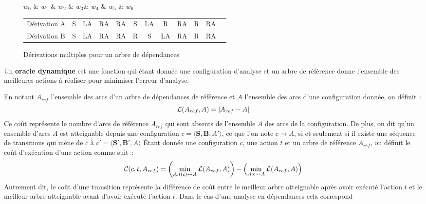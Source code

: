\documentclass[11pt,openany]{book}
\begin{document}
\begin{figure}[htbp]
\begin{center}
\begin{dependency}
\begin{deptext}[column sep=.5cm]
$w_0$ \& $w_1$ \& $w_2$ \& $w_3$\& $w_4$ \& $w_5$ \& $w_6$ \\
\end{deptext}
\end{dependency}
\begin{tabular}{l|ccccccccccc}\toprule
Dérivation A&S&LA&RA&RA&S&LA&R&RA&R&RA\\
Dérivation B&S&LA&RA&RA&R&S&LA&RA&R&RA\\\bottomrule
\end{tabular}
\end{center}
\caption{\label{fig-multi-deriv}Dérivations multiples pour un arbre de dépendances}
\end{figure}

Un {\bf oracle dynamique} est une fonction qui étant donnée une
configuration d'analyse et un arbre de référence donne l'ensemble des meilleures
actions à réaliser pour minimiser l'erreur d'analyse.

En notant $A_{ref}$ l'ensemble des arcs d'un arbre de dépendances de
référence et $A$ l'ensemble des arcs d'une configuration donnée, on
définit~:
\begin{equation}
{\cal L} (A_{ref},A) = |A_{ref} - A|
\end{equation}
Ce coût représente le nombre d'arcs de référence $A_{ref}$ qui sont
absents de l'ensemble  $A$ des arcs de la configuration. 
De plus, on dit qu'un ensemble d'arcs $A$ est atteignable depuis une
configuration $c = \langle \mathbf{S},\mathbf{B},A'\rangle$, ce que
l'on note $c\rightsquigarrow A$, si et seulement si il existe
une séquence de transitions qui mène de $c$ à $c' = \langle \mathbf{S}',\mathbf{B}',A\rangle$
\'Etant donnée une configuration $c$, une action $t$ et un arbre de
référence $A_{ref}$, on définit le coût d'exécution d'une action comme 
suit~:
\begin{equation}
\label{eq-odyn-objective}
{\cal C}(c,t,A_{ref}) = \left(\mathop{\text{min}}_{A:t(c)\rightsquigarrow A} {\cal
  L}(A_{ref},A) \right)- \left(\mathop{\text{min}}_{A:c\rightsquigarrow A} {\cal
  L}(A_{ref},A)  \right) 
\end{equation}
Autrement dit, le coût d'une transition représente la différence de
coût entre le meilleur arbre atteignable après avoir exécuté l'action $t$
et le meilleur arbre atteignable avant d'avoir exécuté l'action
$t$. Dans le cas d'une analyse en dépendances cela correspond 
\end{document}

